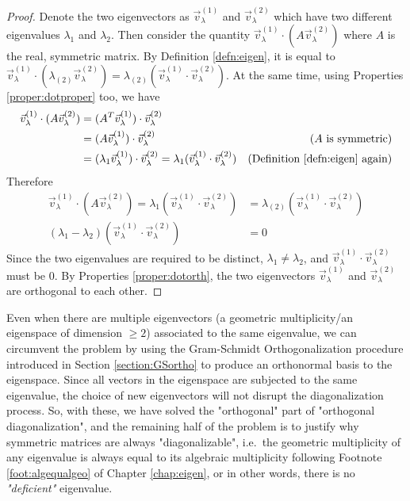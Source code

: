\begin{proof}
Denote the two eigenvectors as $\vec{v}_{\lambda}^{(1)}$ and $\vec{v}_{\lambda}^{(2)}$ which have two different eigenvalues $\lambda_1$ and $\lambda_2$. Then consider the quantity $\vec{v}_{\lambda}^{(1)}\cdot (A\vec{v}_{\lambda}^{(2)})$ where $A$ is the real, symmetric matrix. By Definition \ref{defn:eigen}, it is equal to $\vec{v}_{\lambda}^{(1)}\cdot (\lambda_{(2)}\vec{v}_{\lambda}^{(2)}) = \lambda_{(2)}(\vec{v}_{\lambda}^{(1)}\cdot \vec{v}_{\lambda}^{(2)})$. At the same time, using Properties \ref{proper:dotproper} too, we have
\begin{align*}
\vec{v}_{\lambda}^{(1)}\cdot (A\vec{v}_{\lambda}^{(2)}) &=    (A^T\vec{v}_{\lambda}^{(1)})\cdot \vec{v}_{\lambda}^{(2)} \\
&= (A\vec{v}_{\lambda}^{(1)})\cdot \vec{v}_{\lambda}^{(2)} &\text{($A$ is symmetric)} \\
&= (\lambda_1\vec{v}_{\lambda}^{(1)})\cdot \vec{v}_{\lambda}^{(2)} = \lambda_1(\vec{v}_{\lambda}^{(1)}\cdot \vec{v}_{\lambda}^{(2)}) &\text{(Definition \ref{defn:eigen} again)}
\end{align*}
Therefore
\begin{align*}
\vec{v}_{\lambda}^{(1)}\cdot (A\vec{v}_{\lambda}^{(2)}) =  \lambda_1(\vec{v}_{\lambda}^{(1)}\cdot \vec{v}_{\lambda}^{(2)}) &= \lambda_{(2)}(\vec{v}_{\lambda}^{(1)}\cdot \vec{v}_{\lambda}^{(2)}) \\
(\lambda_{1}-\lambda_{2})(\vec{v}_{\lambda}^{(1)}\cdot \vec{v}_{\lambda}^{(2)}) &= 0
\end{align*}
Since the two eigenvalues are required to be distinct, $\lambda_{1} \neq \lambda_{2}$, and $\vec{v}_{\lambda}^{(1)}\cdot \vec{v}_{\lambda}^{(2)}$ must be $0$. By Properties \ref{proper:dotorth}, the two eigenvectors $\vec{v}_{\lambda}^{(1)}$ and $\vec{v}_{\lambda}^{(2)}$ are orthogonal to each other.
\end{proof}
Even when there are multiple eigenvectors (a geometric multiplicity/an eigenspace of dimension $\geq 2$) associated to the same eigenvalue, we can circumvent the problem by using the Gram-Schmidt Orthogonalization procedure introduced in Section \ref{section:GSortho} to produce an orthonormal basis to the eigenspace. Since all vectors in the eigenspace are subjected to the same eigenvalue, the choice of new eigenvectors will not disrupt the diagonalization process. So, with these, we have solved the "orthogonal" part of "orthogonal diagonalization", and the remaining half of the problem is to justify why symmetric matrices are always "diagonalizable", i.e.\ the geometric multiplicity of any eigenvalue is always equal to its algebraic multiplicity following Footnote \ref{foot:algequalgeo} of Chapter \ref{chap:eigen}, or in other words, there is no \textit{"deficient"} eigenvalue.
